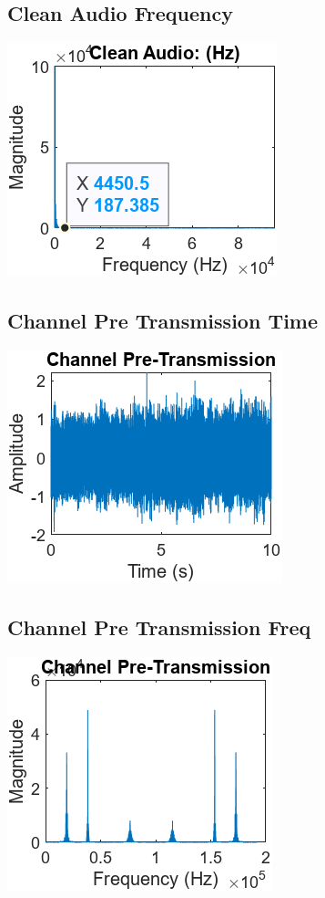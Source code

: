 \documentclass{article}
\begin{document}
\subsection{Clean Audio Frequency}
\label{sec: CleanAudioFreq}
\includegraphics{audioCleanFreq.png}
\subsection{Channel Pre Transmission Time}
\label{sec: ChannelTime}
\includegraphics{channelQuietTimeDomain.png}
\subsection{Channel Pre Transmission Freq}
\label{sec: ChannelFreq}
\includegraphics{channelQuietFreqDomain.png}
\end{document}
